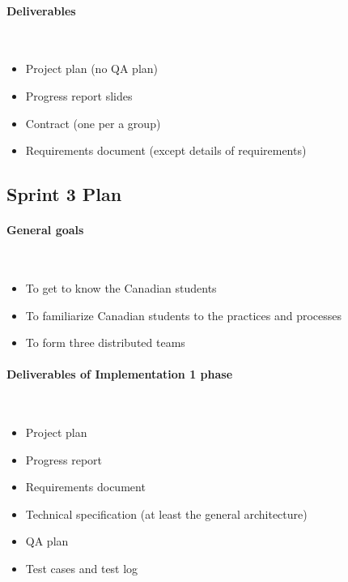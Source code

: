 \paragraph{Deliverables}~
\begin{itemize}
  \item Project plan (no QA plan) \checked
  \item Progress report slides \checked
  \item Contract (one per a group) \checked
  \item Requirements document (except details of requirements)
\end{itemize}

\subsection{Sprint 3 Plan}

\paragraph{General goals}~
\begin{itemize}
  \item To get to know the Canadian students
  \item To familiarize Canadian students to the practices and processes
  \item To form three distributed teams
\end{itemize}

\paragraph{Deliverables of Implementation 1 phase}~
\begin{itemize}
  \item Project plan
  \item Progress report
  \item Requirements document 
  \item Technical specification (at least the general architecture)
  \item QA plan 
  \item Test cases and test log
\end{itemize}

